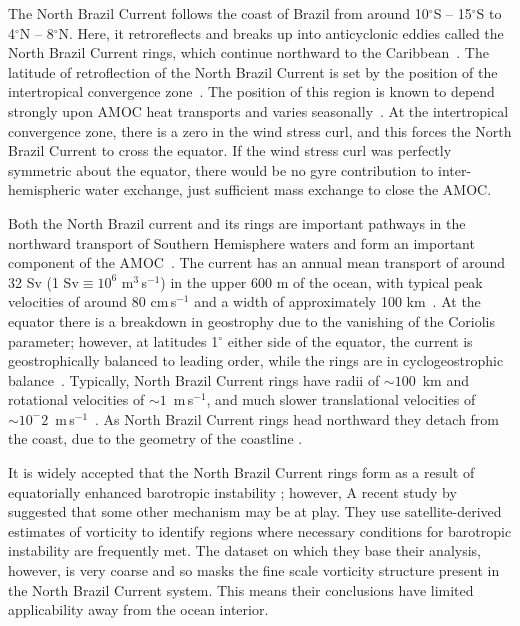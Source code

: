 The North Brazil Current follows the coast of Brazil from around 10$^\circ$S -- 15$^\circ$S to 4$^\circ$N -- 8$^\circ$N. Here, it retroreflects and breaks up into anticyclonic eddies called the North Brazil Current rings, which continue northward to the Caribbean~\citep{Talley2011AtlOce, Garzoli2003, Bourles1999, Fratantoni2006}. The latitude of retroflection of the North Brazil Current is set by the position of the intertropical convergence zone~\citep{Fonseca2004}. The position of this region is known to depend strongly upon AMOC heat transports and varies seasonally~\citep{Zhang2005, Fuckar2013}. At the intertropical convergence zone, there is a zero in the wind stress curl, and this forces the North Brazil Current to cross the equator. If the wind stress curl was perfectly symmetric about the equator, there would be no gyre contribution to inter-hemispheric water exchange, just sufficient mass exchange to close the AMOC.

Both the North Brazil current and its rings are important pathways in the northward transport of Southern Hemisphere waters and form an important component of the AMOC~\citep{Bower2019, Zhang2011}. The current has an annual mean transport of around 32 Sv (1 Sv$\equiv 10^{6}$ m$^3$\,s$^{-1}$) in the upper 600 m of the ocean, with typical peak velocities of around 80 cm\,s$^{-1}$ and a width of approximately 100 km~\citep{Johns1998, Schott1993, Barnier2001}. At the equator there is a breakdown in geostrophy due to the vanishing of the Coriolis parameter; however, at latitudes 1$^\circ$ either side of the equator, the current is geostrophically balanced to leading order, while the rings are in cyclogeostrophic balance~\citep{Vianna2003, Castelao2011}. Typically, North Brazil Current rings have radii of $\sim 100$~km and rotational velocities of $\sim 1$~m\,s$^{-1}$, and much slower translational velocities of $\sim 10^-{2}$~m\,s$^{-1}$~\citep{Castelao2011}. As North Brazil Current rings head northward they detach from the coast, due to the geometry of the coastline \citep{Nof1996b, Nof1996, Zharkov2010, Deremble2017}.

It is widely accepted that the North Brazil Current rings form as a result of equatorially enhanced barotropic instability \citep[e.g.][]{Edwards1998II, Goes2009}; however, A recent study by \citet{Aguedjou2019} suggested that some other mechanism may be at play. They use satellite-derived estimates of vorticity to identify regions where necessary conditions for barotropic instability are frequently met. The dataset on which they base their analysis, however, is very coarse and so masks the fine scale vorticity structure present in the North Brazil Current system. This means their conclusions have limited applicability away from the ocean interior.


